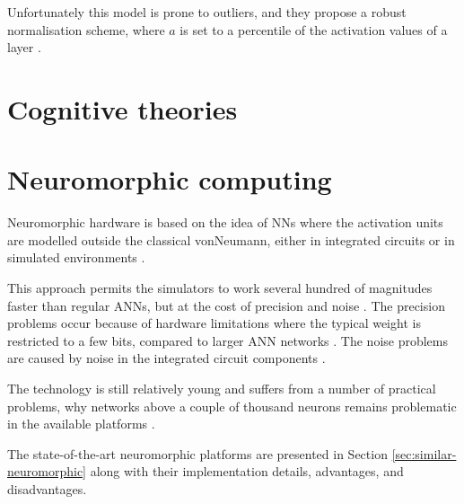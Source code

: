 \documentclass[report.tex]{subfiles}
\begin{document}
Unfortunately this model is prone to outliers, and they propose a robust normalisation scheme,
where $a$ is set to a percentile of the activation values of a layer \cite{Rueckauer2017}.


\section{Cognitive theories}

\section{Neuromorphic computing}
Neuromorphic hardware is based on the idea of \gls{NN}s where the activation
units are modelled outside the classical \gls{vonNeumann}, either in 
integrated circuits or in simulated environments \cite{Albada2018,Blundell2018,Schmitt2017}.

This approach permits the simulators to work several hundred of magnitudes
faster than regular \gls{ANN}s, but at the cost of precision and noise
\cite{Indiveri2015, Schmitt2017}.
The precision problems occur because of hardware limitations where the typical
weight is restricted to a few bits, compared to larger \gls{ANN} networks
\cite{Indiveri2015, Lin2018}.
The noise problems are caused by noise in the integrated circuit components 
\cite{Lin2018, Pfeil2013}.

The technology is still relatively young and suffers from a number
of practical problems, why networks above a couple of thousand neurons remains
problematic in the available platforms \cite{Schmitt2017}.


The state-of-the-art neuromorphic platforms are presented in Section
\ref{sec:similar-neuromorphic} along with their implementation details,
advantages, and disadvantages.

\end{document}
